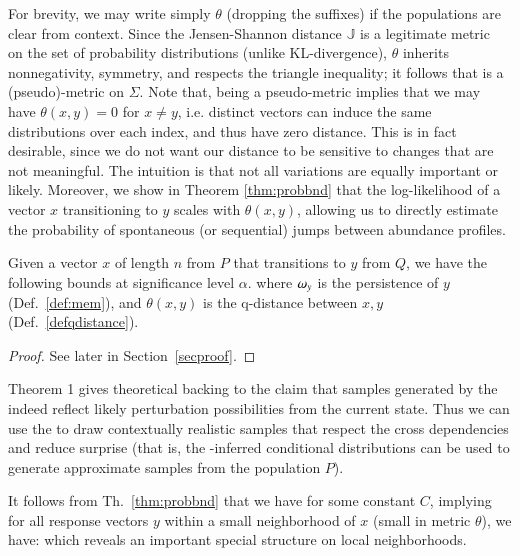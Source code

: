 \documentclass[onecolumn,10pt]{IEEEtran}
\def\x{x}
\def\y{y}
\begin{document}
For brevity, we may write simply $\theta$ (dropping the suffixes) if the populations are clear from context.  Since the Jensen-Shannon distance $\mathbb{J}$ is a legitimate metric~\cite{fuglede2004jensen} on the set of probability distributions (unlike KL-divergence), $\theta$ inherits nonnegativity, symmetry, and respects the triangle inequality; it follows that \qdist is a (pseudo)-metric on $\Sigma$. Note that, being a pseudo-metric implies that  we may have $\theta(\x, \y) = 0$ for $\x \neq \y$, i.e. distinct vectors can induce the same distributions over each index, and thus have zero distance. This is in fact desirable, since we do  not want  our distance to be sensitive to changes that are not meaningful.  The intuition is that not all variations are equally important or likely.    Moreover, we show in Theorem \ref{thm:probbnd} that the log-likelihood of a vector $\x$ transitioning to $\y$ scales with $\theta(\x,\y)$, allowing us to directly estimate the probability of spontaneous (or sequential) jumps between abundance profiles.

\begin{thm}\label{thm:probbnd}
  Given a vector $\x$ of length $n$ from $P$ that transitions to $\y$ from $Q$, we have the following bounds at significance level $\alpha$.
  \cgather{
    \mem{y} e^{ \frac{\sqrt{8}N^2}{1-\alpha}\theta(\x,\y)} \geqq Pr(\x \rightarrow \y) \geqq \mem{\y} e^{-\frac{\sqrt{8}N^2}{1-\alpha}\theta(\x,\y)}
  }%
  where $\mem{\y}$ is the persistence of  $\y$  (Def.~\ref{def:mem}), and $\theta(\x,\y)$ is the q-distance between $\x,\y$ (Def.~\ref{defqdistance}).
\end{thm}

\begin{proof}
  See later in Section~\ref{secproof}.
\end{proof}

Theorem 1 gives theoretical backing to the claim that samples generated by the \qnet indeed reflect likely perturbation possibilities from the current state.  Thus we can use the \qnet to draw contextually realistic samples that respect the  cross dependencies and reduce surprise  (that is, the \qnet-inferred conditional distributions can be used to  generate approximate samples from the population $P$). 

\begin{rem}\label{rem:neighborhood}
  It follows from Th.~\ref{thm:probbnd} that we have for some constant $C$,
  implying for all response vectors $y$ within a small neighborhood of $x$ (small in metric $\theta$), we
  have:
  which reveals an important special structure on local neighborhoods.
\end{rem}
\end{document}
